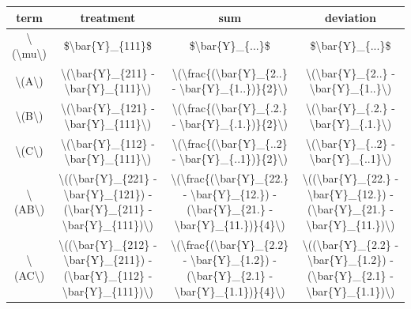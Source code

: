 \documentclass[]{book}
\begin{document}
\begin{table}[H]
\centering
\begin{tabular}{c|c|c|c}
\hline
term & treatment & sum & deviation\\
\hline
\textbackslash{}(\textbackslash{}mu\textbackslash{}) & \$\textbackslash{}bar\{Y\}\_\{111\}\$ & \$\textbackslash{}bar\{Y\}\_\{...\}\$ & \$\textbackslash{}bar\{Y\}\_\{...\}\$\\
\hline
\textbackslash{}(A\textbackslash{}) & \textbackslash{}(\textbackslash{}bar\{Y\}\_\{211\} - \textbackslash{}bar\{Y\}\_\{111\}\textbackslash{}) & \textbackslash{}(\textbackslash{}frac\{(\textbackslash{}bar\{Y\}\_\{2..\} - \textbackslash{}bar\{Y\}\_\{1..\})\}\{2\}\textbackslash{}) & \textbackslash{}(\textbackslash{}bar\{Y\}\_\{2..\} - \textbackslash{}bar\{Y\}\_\{1..\}\textbackslash{})\\
\hline
\textbackslash{}(B\textbackslash{}) & \textbackslash{}(\textbackslash{}bar\{Y\}\_\{121\} - \textbackslash{}bar\{Y\}\_\{111\}\textbackslash{}) & \textbackslash{}(\textbackslash{}frac\{(\textbackslash{}bar\{Y\}\_\{.2.\} - \textbackslash{}bar\{Y\}\_\{.1.\})\}\{2\}\textbackslash{}) & \textbackslash{}(\textbackslash{}bar\{Y\}\_\{.2.\} - \textbackslash{}bar\{Y\}\_\{.1.\}\textbackslash{})\\
\hline
\textbackslash{}(C\textbackslash{}) & \textbackslash{}(\textbackslash{}bar\{Y\}\_\{112\} - \textbackslash{}bar\{Y\}\_\{111\}\textbackslash{}) & \textbackslash{}(\textbackslash{}frac\{(\textbackslash{}bar\{Y\}\_\{..2\} - \textbackslash{}bar\{Y\}\_\{..1\})\}\{2\}\textbackslash{}) & \textbackslash{}(\textbackslash{}bar\{Y\}\_\{..2\} - \textbackslash{}bar\{Y\}\_\{..1\}\textbackslash{})\\
\hline
\textbackslash{}(AB\textbackslash{}) & \textbackslash{}((\textbackslash{}bar\{Y\}\_\{221\} - \textbackslash{}bar\{Y\}\_\{121\}) - (\textbackslash{}bar\{Y\}\_\{211\} - \textbackslash{}bar\{Y\}\_\{111\})\textbackslash{}) & \textbackslash{}(\textbackslash{}frac\{(\textbackslash{}bar\{Y\}\_\{22.\} - \textbackslash{}bar\{Y\}\_\{12.\}) - (\textbackslash{}bar\{Y\}\_\{21.\} - \textbackslash{}bar\{Y\}\_\{11.\})\}\{4\}\textbackslash{}) & \textbackslash{}((\textbackslash{}bar\{Y\}\_\{22.\} - \textbackslash{}bar\{Y\}\_\{12.\}) - (\textbackslash{}bar\{Y\}\_\{21.\} - \textbackslash{}bar\{Y\}\_\{11.\})\textbackslash{})\\
\hline
\textbackslash{}(AC\textbackslash{}) & \textbackslash{}((\textbackslash{}bar\{Y\}\_\{212\} - \textbackslash{}bar\{Y\}\_\{211\}) - (\textbackslash{}bar\{Y\}\_\{112\} - \textbackslash{}bar\{Y\}\_\{111\})\textbackslash{}) & \textbackslash{}(\textbackslash{}frac\{(\textbackslash{}bar\{Y\}\_\{2.2\} - \textbackslash{}bar\{Y\}\_\{1.2\}) - (\textbackslash{}bar\{Y\}\_\{2.1\} - \textbackslash{}bar\{Y\}\_\{1.1\})\}\{4\}\textbackslash{}) & \textbackslash{}((\textbackslash{}bar\{Y\}\_\{2.2\} - \textbackslash{}bar\{Y\}\_\{1.2\}) - (\textbackslash{}bar\{Y\}\_\{2.1\} - \textbackslash{}bar\{Y\}\_\{1.1\})\textbackslash{})\\

\end{tabular}
\end{table}
\end{document}
